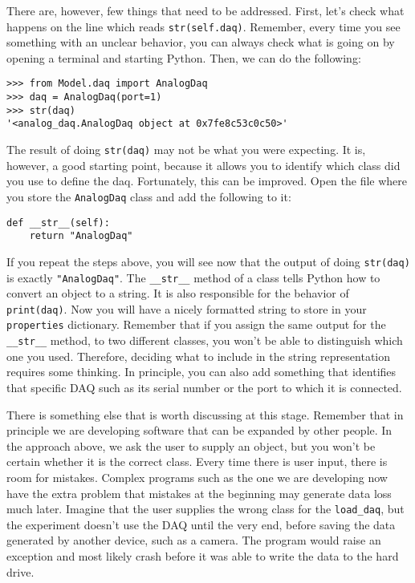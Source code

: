 {There are, however, few things that need to be addressed. First, let's check what happens on the line which reads \texttt{str(self.daq)}. Remember, every time you see something with an unclear behavior, you can always check what is going on by opening a terminal and starting Python. Then, we can do the following:

\begin{verbatim}
>>> from Model.daq import AnalogDaq
>>> daq = AnalogDaq(port=1)
>>> str(daq)
'<analog_daq.AnalogDaq object at 0x7fe8c53c0c50>'
\end{verbatim}

The result of doing \texttt{str(daq)} may not be what you were expecting. It is, however, a good starting point, because it allows you to identify which class did you use to define the daq. Fortunately, this can be improved. Open the file where you store the \texttt{AnalogDaq} class and add the following to it:

\begin{verbatim}
def __str__(self):
    return "AnalogDaq"
\end{verbatim}

If you repeat the steps above, you will see now that the output of doing \texttt{str(daq)} is exactly \texttt{"AnalogDaq"}. The
\texttt{__str__} method of a class tells Python how to convert an object to a string. It is also responsible for the behavior of \texttt{print(daq)}. Now you will have a nicely formatted string to store in your \texttt{properties} dictionary. Remember that if you assign the same output for the \texttt{__str__} method, to two different classes, you won't be able to distinguish which one you used. Therefore, deciding what to include in the string representation requires some thinking. In principle, you can also add something that identifies that specific DAQ such as its serial number or the port to which it is connected. 

There is something else that is worth discussing at this stage. Remember that in principle we are developing software that can be expanded by other people. In the approach above, we ask the user to supply an object, but you won't be certain whether it is the correct class. Every time there is user input, there is room for mistakes. Complex programs such as the one we are developing now have the extra problem that mistakes at the beginning may generate data loss much later. Imagine that the user supplies the wrong class for the \texttt{load_daq}, but the experiment doesn't use the DAQ until the very end, before saving the data generated by another device, such as a camera. The program would raise an exception and most likely crash before it was able to write the data to the hard drive. 

}
